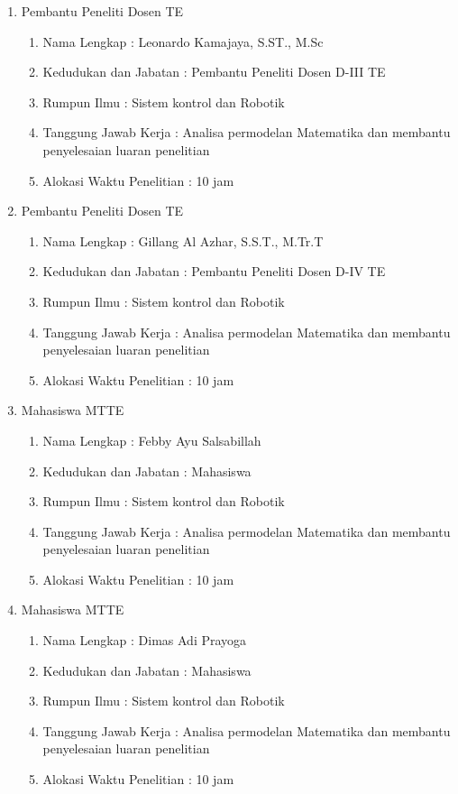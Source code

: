 \begin{enumerate}
	
	\item Pembantu Peneliti Dosen TE
	\begin{enumerate}
		\item Nama Lengkap : Leonardo Kamajaya, S.ST., M.Sc
		\item Kedudukan dan Jabatan : Pembantu Peneliti Dosen D-III TE
		\item Rumpun Ilmu : Sistem kontrol dan Robotik
		\item Tanggung Jawab Kerja : Analisa permodelan Matematika dan membantu penyelesaian luaran penelitian
		\item Alokasi Waktu Penelitian : 10 jam 
	\end{enumerate}
	

	
	\item Pembantu Peneliti Dosen TE
	\begin{enumerate}
		\item Nama Lengkap : Gillang Al Azhar, S.S.T., M.Tr.T
		\item Kedudukan dan Jabatan : Pembantu Peneliti Dosen D-IV TE
		\item Rumpun Ilmu : Sistem kontrol dan Robotik
		\item Tanggung Jawab Kerja : Analisa permodelan Matematika dan membantu penyelesaian luaran penelitian
		\item Alokasi Waktu Penelitian : 10 jam 
	\end{enumerate}
	
	\item Mahasiswa MTTE
	\begin{enumerate}
		\item Nama Lengkap : Febby Ayu Salsabillah
		\item Kedudukan dan Jabatan : Mahasiswa
		\item Rumpun Ilmu : Sistem kontrol dan Robotik
		\item Tanggung Jawab Kerja : Analisa permodelan Matematika dan membantu penyelesaian luaran penelitian
		\item Alokasi Waktu Penelitian : 10 jam 
	\end{enumerate}
\item Mahasiswa MTTE
	\begin{enumerate}
		\item Nama Lengkap : Dimas Adi Prayoga
		\item Kedudukan dan Jabatan : Mahasiswa
		\item Rumpun Ilmu : Sistem kontrol dan Robotik
		\item Tanggung Jawab Kerja : Analisa permodelan Matematika dan membantu penyelesaian luaran penelitian
		\item Alokasi Waktu Penelitian : 10 jam 
	\end{enumerate}
 
\end{enumerate}